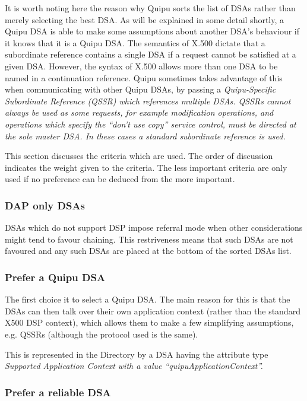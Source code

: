 It is worth noting here the reason why Quipu sorts the list of DSAs rather
than merely selecting the best DSA.  As will be explained in some detail
shortly, a Quipu DSA is able to make some assumptions about another 
DSA's behaviour if it knows that it is a Quipu DSA.  The semantics of X.500
dictate that a subordinate reference contains a single DSA 
if a request cannot be
satisfied at a given DSA.  However, the syntax of X.500 allows more than one 
DSA
to be named in a continuation reference.  Quipu sometimes takes advantage 
of this when communicating with other Quipu DSAs, by passing a
\it
Quipu-Specific Subordinate Reference
\rm
(QSSR) which references multiple DSAs. QSSRs cannot always be used 
as some requests, for example
modification operations, and operations which specify the ``don't use copy''
service control, must be directed at the sole master DSA.  In these cases a
standard subordinate reference is used.

This section discusses the criteria
which are used. The order of discussion indicates the weight given 
to the criteria.  The less important criteria are only used if no preference
can be deduced from the more important.
\subsubsection{DAP only DSAs}

DSAs which do not support DSP impose referral mode when other 
considerations might tend to favour chaining.  This restriveness means that
such DSAs are not favoured and any such DSAs
are placed at the bottom of the sorted DSAs list.
\subsubsection{Prefer a Quipu DSA}

The first choice it to select a Quipu DSA.
The main reason for this is that the DSAs can then talk over their own
application context (rather than the standard X500 DSP context), which
allows them to make a few simplifying assumptions, e.g. QSSRs (although 
the protocol used is the same).

This is represented in the Directory by a DSA having the attribute type
\it
Supported Application Context
\rm
with a value ``quipuApplicationContext''.
\subsubsection{Prefer a reliable DSA}

